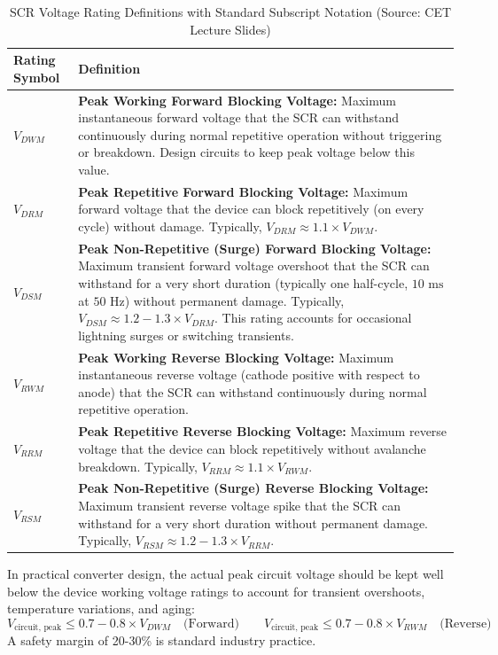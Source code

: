 \documentclass[11pt,a4paper]{article}
\begin{document}
\begin{table}[htbp]
\centering
\small
\caption{SCR Voltage Rating Definitions with Standard Subscript Notation (Source: CET Lecture Slides)}
\label{tab:scr_voltage_ratings}
\begin{tabularx}{\textwidth}{l X}
\toprule
\textbf{Rating Symbol} & \textbf{Definition} \\
\midrule
\textbf{$V_{DWM}$} & \textbf{Peak Working Forward Blocking Voltage:} Maximum instantaneous forward voltage that the SCR can withstand continuously during normal repetitive operation without triggering or breakdown. Design circuits to keep peak voltage below this value. \\
\addlinespace
\textbf{$V_{DRM}$} & \textbf{Peak Repetitive Forward Blocking Voltage:} Maximum forward voltage that the device can block repetitively (on every cycle) without damage. Typically, $V_{DRM} \approx 1.1 \times V_{DWM}$. \\
\addlinespace
\textbf{$V_{DSM}$} & \textbf{Peak Non-Repetitive (Surge) Forward Blocking Voltage:} Maximum transient forward voltage overshoot that the SCR can withstand for a very short duration (typically one half-cycle, $10\text{ ms}$ at $50\text{ Hz}$) without permanent damage. Typically, $V_{DSM} \approx 1.2 - 1.3 \times V_{DRM}$. This rating accounts for occasional lightning surges or switching transients. \\
\midrule
\textbf{$V_{RWM}$} & \textbf{Peak Working Reverse Blocking Voltage:} Maximum instantaneous reverse voltage (cathode positive with respect to anode) that the SCR can withstand continuously during normal repetitive operation. \\
\addlinespace
\textbf{$V_{RRM}$} & \textbf{Peak Repetitive Reverse Blocking Voltage:} Maximum reverse voltage that the device can block repetitively without avalanche breakdown. Typically, $V_{RRM} \approx 1.1 \times V_{RWM}$. \\
\addlinespace
\textbf{$V_{RSM}$} & \textbf{Peak Non-Repetitive (Surge) Reverse Blocking Voltage:} Maximum transient reverse voltage spike that the SCR can withstand for a very short duration without permanent damage. Typically, $V_{RSM} \approx 1.2 - 1.3 \times V_{RRM}$. \\
\bottomrule
\end{tabularx}
\end{table}

\begin{conceptbox}
In practical converter design, the actual peak circuit voltage should be kept well below the device working voltage ratings to account for transient overshoots, temperature variations, and aging:
\begin{equation}
V_{\text{circuit, peak}} \le 0.7 - 0.8 \times V_{DWM} \quad \text{(Forward)} \qquad V_{\text{circuit, peak}} \le 0.7 - 0.8 \times V_{RWM} \quad \text{(Reverse)}
\end{equation}
A safety margin of 20-30\% is standard industry practice.
\end{conceptbox}
\end{document}
